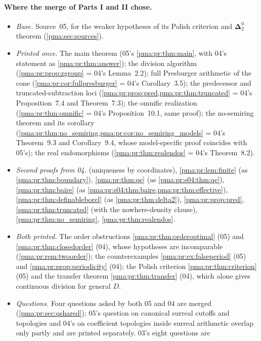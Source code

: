 \documentclass[11pt]{article}
\numberwithin{equation}{section}
\theoremstyle{definition}
\theoremstyle{remark}
\newcommand{\Dtwo}{\boldsymbol{\Delta}^{0}_{2}}
\begin{document}
\paragraph{Where the merge of Parts I and II chose.}
\begin{itemize}
\item \emph{Base.} Source~05, for the weaker hypotheses of its Polish
criterion and $\Dtwo$ theorem (\cref{pma:sec:sources}).
\item \emph{Printed once.} The main theorem (05's \cref{pma:pr:thm:main}, with
04's statement as \cref{pma:pr:thm:answer}); the division algorithm
(\cref{pma:pr:prop:zgroup} = 04's Lemma~2.2); full Presburger arithmetic of
the cone (\cref{pma:pr:cor:fullpresburger} = 04's Corollary~3.5); the
predecessor and truncated-subtraction loci (\cref{pma:pr:prop:pred,pma:pr:thm:truncated}
= 04's Proposition~7.4 and Theorem~7.3); the omnific realization
(\cref{pma:pr:thm:omnific} = 04's Proposition~10.1, same proof); the
no-semiring theorem and its corollary
(\cref{pma:pr:thm:no_semiring,pma:pr:cor:no_semiring_models} = 04's
Theorem~9.3 and Corollary~9.4, whose model-specific proof coincides with
05's); the real endomorphisms (\cref{pma:pr:thm:realendos} = 04's
Theorem~8.2).
\item \emph{Second proofs from 04.} 
(uniqueness by coordinates), \cref{pma:pr:lem:finite} (as
\cref{pma:pr:thm:boundary}), \cref{pma:pr:thm:qe} (as
\cref{pma:pr:s04:thm:qe}), \cref{pma:pr:thm:baire} (as
\cref{pma:pr:s04:thm:baire,pma:pr:thm:effective}), \cref{pma:pr:thm:definableborel}
(as \cref{pma:pr:thm:delta2}), \cref{pma:pr:prop:pred},
\cref{pma:pr:thm:truncated} (with the nowhere-density clause),
\cref{pma:pr:thm:no_semiring}, \cref{pma:pr:thm:realendos}.
\item \emph{Both printed.} The order obstructions
\cref{pma:pr:thm:orderoptimal} (05) and \cref{pma:pr:thm:closedorder} (04),
whose hypotheses are incomparable (\cref{pma:pr:rem:twoorder}); the
counterexamples \cref{pma:pr:ex:falseperiod} (05) and
\cref{pma:pr:prop:periodicity} (04); the Polish criterion
\cref{pma:pr:thm:criterion} (05) and the transfer theorem
\cref{pma:pr:thm:transfer} (04), which alone gives continuous division for
general $D$.
\item \emph{Questions.} Four questions asked by both 05 and 04 are merged
(\cref{pma:pr:sec:qshared}); 05's question on canonical surreal cutoffs and
topologies and 04's on coefficient topologies inside surreal arithmetic
overlap only partly and are printed separately. 03's eight questions are

\end{itemize}
\end{document}
